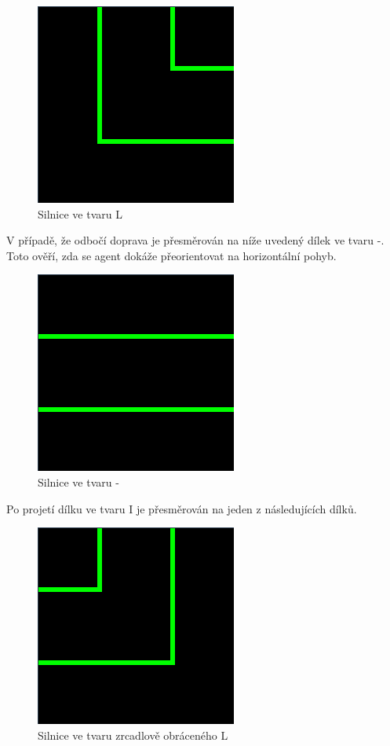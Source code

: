 \begin{figure}[H]
	\centering
	\includegraphics[scale=0.6]{pieces/L}
	\caption{Silnice ve tvaru L}
	\label{fig:l}
\end{figure}
V případě, že odbočí doprava je přesměrován na níže uvedený dílek ve tvaru -. Toto ověří, zda se agent dokáže přeorientovat na horizontální pohyb.
\begin{figure}[H]
	\centering
	\includegraphics[scale=0.6]{pieces/-}
	\caption{Silnice ve tvaru -}
	\label{fig:-}
\end{figure}
Po projetí dílku ve tvaru I je přesměrován na jeden z následujících dílků.
\begin{figure}[H]
	\centering
	\includegraphics[scale=0.6]{pieces/inverted_L}
	\caption{Silnice ve tvaru zrcadlově obráceného L}
	\label{fig:invertedl}
\end{figure}
